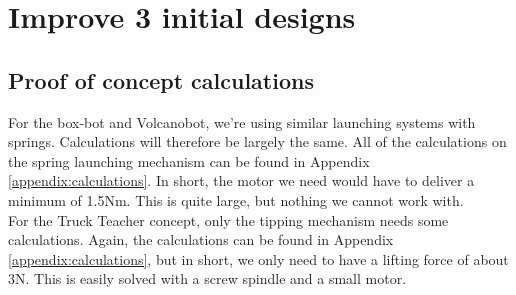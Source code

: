 \documentclass[11pt,twoside,a4paper]{report}
\begin{document}
\chapter{Improve 3 initial designs}
\section{Proof of concept calculations}
For the box-bot and Volcanobot, we’re using similar launching systems with springs. Calculations will therefore be largely the same.
All of the calculations on the spring launching mechanism can be found in Appendix \ref{appendix:calculations}. In short, the motor we need would have to deliver a minimum of 1.5Nm. This is quite large, but nothing we cannot work with.\\
For the Truck Teacher concept, only the tipping mechanism needs some calculations. Again, the calculations can be found in Appendix \ref{appendix:calculations}, but in short, we only need to have a lifting force of about 3N. This is easily solved with a screw spindle and a small motor.
\end{document}
